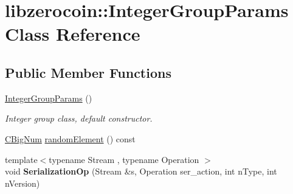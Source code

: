 \hypertarget{classlibzerocoin_1_1_integer_group_params}{}\section{libzerocoin\+:\+:Integer\+Group\+Params Class Reference}
\label{classlibzerocoin_1_1_integer_group_params}
\subsection*{Public Member Functions}
\begin{DoxyCompactItemize}
\item 
\mbox{\hyperlink{classlibzerocoin_1_1_integer_group_params_ae37d4d4e9c525069a15155e454d7f48e}{Integer\+Group\+Params}} ()
\begin{DoxyCompactList}\small\item\em Integer group class, default constructor. \end{DoxyCompactList}\item 
\mbox{\hyperlink{class_c_big_num}{C\+Big\+Num}} \mbox{\hyperlink{classlibzerocoin_1_1_integer_group_params_a012079a03d0aeacc42fe005ed7c0ab62}{random\+Element}} () const
\item 
\mbox{\label{classlibzerocoin_1_1_integer_group_params_a3341e72981d4e7551c7d8fe26f615848}} 
{\footnotesize template$<$typename Stream , typename Operation $>$ }\\void {\bfseries Serialization\+Op} (Stream \&s, Operation ser\+\_\+action, int n\+Type, int n\+Version)
\end{DoxyCompactItemize}
